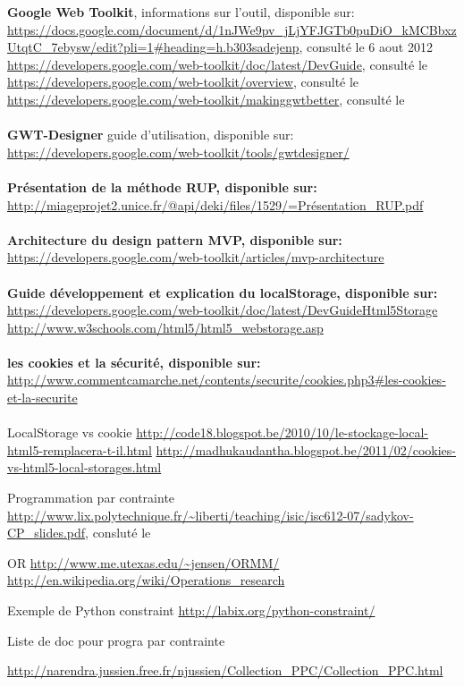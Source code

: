 \begin{thebibliography}{99}
 \textbf{Google Web Toolkit}, informations sur l'outil, disponible sur:\newline
\url{https://docs.google.com/document/d/1nJWe9pv_jLjYFJGTb0puDiO_kMCBbxzUtqtC_7ebysw/edit?pli=1\#heading=h.b303sadejenp}, consulté le 6 aout 2012\\
\url{https://developers.google.com/web-toolkit/doc/latest/DevGuide}, consulté le \\
\url{https://developers.google.com/web-toolkit/overview}, consulté le \\
\url{https://developers.google.com/web-toolkit/makinggwtbetter}, consulté le\\
\\
\textbf{GWT-Designer} guide d'utilisation, disponible sur:\newline
\url{https://developers.google.com/web-toolkit/tools/gwtdesigner/} \\
\\
\textbf{Présentation de la méthode RUP, disponible sur:}
\url{http://miageprojet2.unice.fr/@api/deki/files/1529/=Présentation_RUP.pdf}\\
\\
\textbf{Architecture du design pattern MVP, disponible sur:}
\url{https://developers.google.com/web-toolkit/articles/mvp-architecture}\\
\\
\textbf{Guide développement et explication du localStorage, disponible sur:}
\url{https://developers.google.com/web-toolkit/doc/latest/DevGuideHtml5Storage}\\
\url{http://www.w3schools.com/html5/html5_webstorage.asp}\\
\\
\textbf{les cookies et la sécurité, disponible sur:}
\url{http://www.commentcamarche.net/contents/securite/cookies.php3#les-cookies-et-la-securite}\\
\\
LocalStorage vs cookie
\url{http://code18.blogspot.be/2010/10/le-stockage-local-html5-remplacera-t-il.html}
\url{http://madhukaudantha.blogspot.be/2011/02/cookies-vs-html5-local-storages.html}

Programmation par contrainte
\url{http://www.lix.polytechnique.fr/~liberti/teaching/isic/isc612-07/sadykov-CP_slides.pdf}, consluté le 

OR
\url{http://www.me.utexas.edu/~jensen/ORMM/}
\url{http://en.wikipedia.org/wiki/Operations_research}

Exemple de Python constraint 
\url{http://labix.org/python-constraint/}

Liste de doc pour progra par contrainte

\url{http://narendra.jussien.free.fr/njussien/Collection_PPC/Collection_PPC.html}
\end{thebibliography} 
